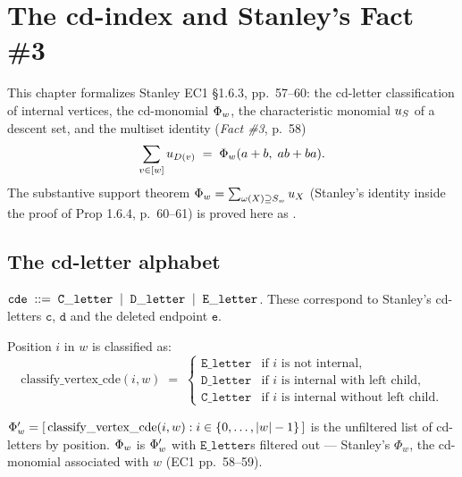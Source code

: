 \chapter{The cd-index and Stanley's Fact \#3}
\label{ch:cdindex}

This chapter formalizes Stanley EC1 \S1.6.3, pp.~57--60: the cd-letter
classification of internal vertices, the cd-monomial $\Phi_{w}$, the
characteristic monomial $u_{S}$ of a descent set, and the
multiset identity (\emph{Fact \#3}, p.~58)
\[
  \sum_{v \in [w]} u_{D(v)}
  \;=\;
  \Phi_{w}(a + b,\; ab + ba).
\]
The substantive support theorem \emph{$\Phi_{w} = \sum_{\omega(X)
\supseteq S_w} u_{X}$} (Stanley's identity inside the proof of
Prop 1.6.4, p.~60--61) is proved here as
.

\section{The cd-letter alphabet}

\begin{definition}
  \label{def:cde}
  \rocqok
  $\texttt{cde} \;::=\; \mathtt{C\_letter} \;\mid\; \mathtt{D\_letter}
  \;\mid\; \mathtt{E\_letter}$.  These correspond to Stanley's
  cd-letters $\mathtt{c}$, $\mathtt{d}$ and the deleted endpoint
  $\mathtt{e}$.
\end{definition}

\begin{definition}
  \label{def:classify_vertex_cde}
  \rocqok
  Position $i$ in $w$ is classified as:
  \[
    \mathrm{classify\_vertex\_cde}(i, w)
    \;=\;
    \begin{cases}
      \mathtt{E\_letter} & \text{if $i$ is not internal,} \\
      \mathtt{D\_letter} & \text{if $i$ is internal with left child,} \\
      \mathtt{C\_letter} & \text{if $i$ is internal without left child.}
    \end{cases}
  \]
\end{definition}

\begin{definition}
  \label{def:phi_w}
  \rocqok
  $\Phi'_{w} = [\,\mathrm{classify\_vertex\_cde}(i, w) : i \in \{0,
  \dots, |w|-1\}\,]$ is the unfiltered list of cd-letters by position.
  $\Phi_{w}$ is $\Phi'_{w}$ with $\mathtt{E\_letter}$s filtered out
  — Stanley's $\Phi_w$, the cd-monomial associated with $w$ (EC1
  pp.~58--59).
\end{definition}

